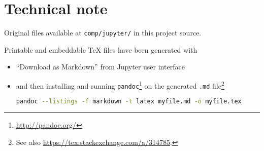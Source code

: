 \section*{Technical note}

Original files available at \verb#comp/jupyter/# in this project source.

Printable and embeddable \TeX{} files have been generated with
\begin{itemize}
  \item
    ``Download as Markdown'' from Jupyter user interface
  \item
    and then installing and running \verb#pandoc#\footnote{ \url{http://pandoc.org/}}
    on the generated \verb#.md# file\footnote{ See also \url{https://tex.stackexchange.com/a/314785}.}
    \begin{lstlisting}[language=Bash]
      pandoc --listings -f markdown -t latex myfile.md -o myfile.tex
    \end{lstlisting}
\end{itemize}
